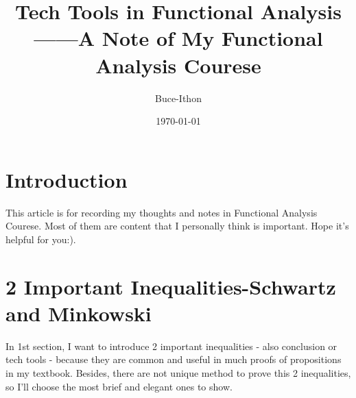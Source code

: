 \documentclass{Math_Note}
\title{Tech Tools in Functional Analysis \\ \small ------A Note of My Functional Analysis Courese}
\author{Buce-Ithon}
\date{\today}
\begin{document}
\maketitle

\newpage
\tableofcontents
\newpage

\section{Introduction}
This article is for recording my thoughts and notes in Functional Analysis Courese. Most of them are content that I personally think is important.
Hope it's helpful for you:).

\section{2 Important Inequalities-Schwartz and Minkowski}
In 1st section, I want to introduce 2 important inequalities - also conclusion or tech tools - because they are common and useful in much proofs of propositions in 
my textbook. Besides, there are not unique method to prove this 2 inequalities, so I'll choose the most brief and elegant ones to show.
\end{document}
